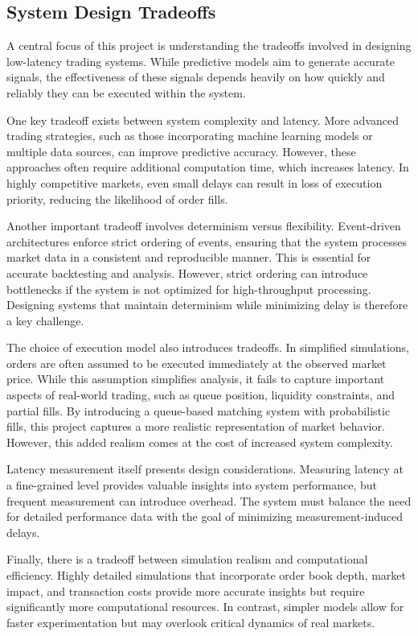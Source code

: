 \documentclass[12pt]{article}
\begin{document}
\subsection{System Design Tradeoffs}

A central focus of this project is understanding the tradeoffs involved 
in designing low-latency trading systems. While predictive models aim 
to generate accurate signals, the effectiveness of these signals depends 
heavily on how quickly and reliably they can be executed within the system.

One key tradeoff exists between system complexity and latency. More 
advanced trading strategies, such as those incorporating machine learning 
models or multiple data sources, can improve predictive accuracy. However, 
these approaches often require additional computation time, which increases 
latency. In highly competitive markets, even small delays can result in 
loss of execution priority, reducing the likelihood of order fills.

Another important tradeoff involves determinism versus flexibility. 
Event-driven architectures enforce strict ordering of events, ensuring 
that the system processes market data in a consistent and reproducible 
manner. This is essential for accurate backtesting and analysis. However, 
strict ordering can introduce bottlenecks if the system is not optimized 
for high-throughput processing. Designing systems that maintain 
determinism while minimizing delay is therefore a key challenge.

The choice of execution model also introduces tradeoffs. In simplified 
simulations, orders are often assumed to be executed immediately at the 
observed market price. While this assumption simplifies analysis, it 
fails to capture important aspects of real-world trading, such as queue 
position, liquidity constraints, and partial fills. By introducing a 
queue-based matching system with probabilistic fills, this project 
captures a more realistic representation of market behavior. However, 
this added realism comes at the cost of increased system complexity.

Latency measurement itself presents design considerations. Measuring 
latency at a fine-grained level provides valuable insights into system 
performance, but frequent measurement can introduce overhead. The system 
must balance the need for detailed performance data with the goal of 
minimizing measurement-induced delays.

Finally, there is a tradeoff between simulation realism and computational 
efficiency. Highly detailed simulations that incorporate order book depth, 
market impact, and transaction costs provide more accurate insights but 
require significantly more computational resources. In contrast, simpler 
models allow for faster experimentation but may overlook critical dynamics 
of real markets.
\end{document}
